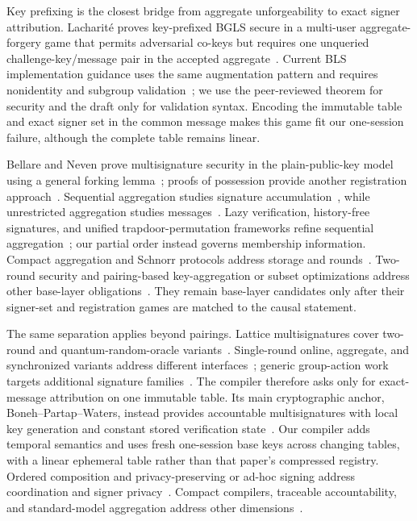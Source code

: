 \documentclass[11pt]{article}
\theoremstyle{definition}
\begin{document}
Key prefixing is the closest bridge from aggregate unforgeability to exact signer attribution.  Lacharit\'e proves key-prefixed BGLS secure in a multi-user aggregate-forgery game that permits adversarial co-keys but requires one unqueried challenge-key/message pair in the accepted aggregate~\cite{lacharite2018multiuser}.  Current BLS implementation guidance uses the same augmentation pattern and requires nonidentity and subgroup validation~\cite{boneh2026blsdraft}; we use the peer-reviewed theorem for security and the draft only for validation syntax.  Encoding the immutable table and exact signer set in the common message makes this game fit our one-session failure, although the complete table remains linear.

Bellare and Neven prove multisignature security in the plain-public-key model using a general forking lemma~\cite{bellare2006plain}; proofs of possession provide another registration approach~\cite{ristenpart2007pop}.  Sequential aggregation studies signature accumulation~\cite{lu2006sequential,lysyanskaya2004sequential}, while unrestricted aggregation studies messages~\cite{bellare2007aggregate}. Lazy verification, history-free signatures, and unified trapdoor-permutation frameworks refine sequential aggregation~\cite{brogle2012lazy,fischlin2012historyfree,gentry2018unified}; our partial order instead governs membership information.  Compact aggregation and Schnorr protocols address storage and rounds~\cite{boneh2018compact,maxwell2019musig,nick2021musig2}. Two-round security and pairing-based key-aggregation or subset optimizations address other base-layer obligations~\cite{drijvers2019security,kojima2024tight,baldimtsi2024subset}.  They remain base-layer candidates only after their signer-set and registration games are matched to the causal statement.

The same separation applies beyond pairings.  Lattice multisignatures cover two-round and quantum-random-oracle variants~\cite{damgard2021lattice,fukumitsu2020lattice}. Single-round online, aggregate, and synchronized variants address different interfaces~\cite{boschini2022musigl,elbansarkhani2014aggregate,fleischhacker2023chipmunk}; generic group-action work targets additional signature families~\cite{dalconzo2025groupaction}.  The compiler therefore asks only for exact-message attribution on one immutable table.  Its main cryptographic anchor, Boneh--Partap--Waters, instead provides accountable multisignatures with local key generation and constant stored verification state~\cite{boneh2025accountable}.  Our compiler adds temporal semantics and uses fresh one-session base keys across changing tables, with a linear ephemeral table rather than that paper's compressed registry.  Ordered composition and privacy-preserving or ad-hoc signing address coordination and signer privacy~\cite{baum2025ordered,haidar2025privacy,lehmann2024adhoc}. Compact compilers, traceable accountability, and standard-model aggregation address other dimensions~\cite{jiang2025compact,wang2026traceable,hohenberger2025aggregate}.
\end{document}
